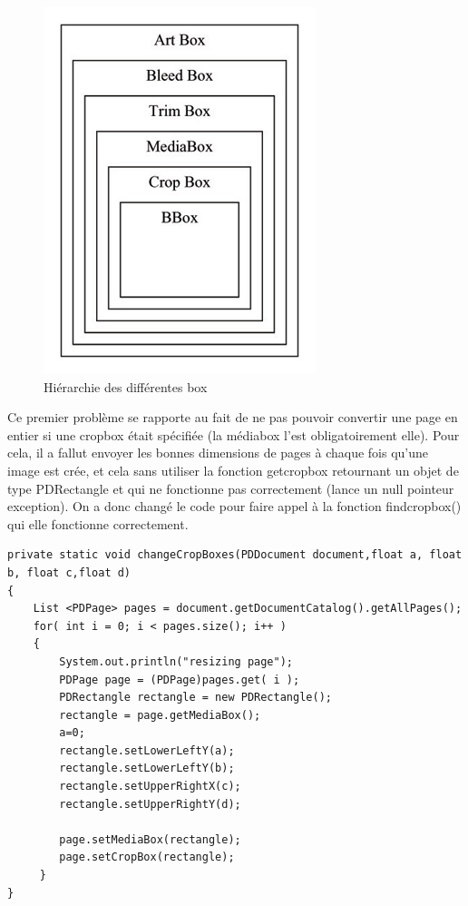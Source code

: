      \begin{figure}[h]
            \begin{center}
            \includegraphics[scale=0.6]{crop_media_box.jpg} 
            \end{center}
            \caption{Hiérarchie des différentes box}
            \label{Hiérarchie des différentes box}
     \end{figure}

	        Ce premier problème se rapporte au fait de ne pas pouvoir convertir
        une page en entier si une cropbox était spécifiée (la médiabox l'est 
        obligatoirement elle). Pour cela, il a fallut envoyer les bonnes dimensions 
        de pages à chaque fois qu'une image est crée, et cela sans utiliser la fonction
        getcropbox retournant un objet de type PDRectangle et qui ne fonctionne 
        pas correctement (lance un null pointeur exception). On a donc changé le
        code pour faire appel à la fonction findcropbox() qui elle fonctionne 
        correctement.




    \lstset{language=Java}
	\begin{lstlisting} 
private static void changeCropBoxes(PDDocument document,float a, float b, float c,float d)
{
	List <PDPage> pages = document.getDocumentCatalog().getAllPages();
	for( int i = 0; i < pages.size(); i++ )
	{
        System.out.println("resizing page");
        PDPage page = (PDPage)pages.get( i );
        PDRectangle rectangle = new PDRectangle();
        rectangle = page.getMediaBox();
        a=0;
        rectangle.setLowerLeftY(a);
        rectangle.setLowerLeftY(b);
        rectangle.setUpperRightX(c);
        rectangle.setUpperRightY(d);

        page.setMediaBox(rectangle);
        page.setCropBox(rectangle);
	 }
}
 \end{lstlisting}

